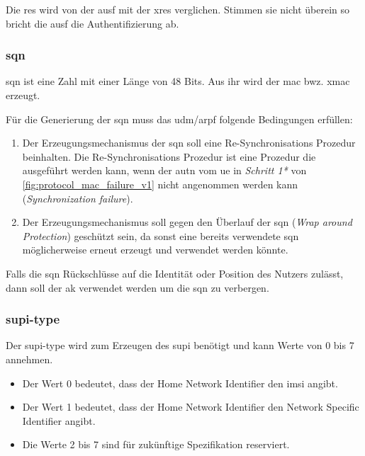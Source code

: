 Die \gls{res} wird von der \gls{ausf} mit der \gls{xres} verglichen.
Stimmen sie nicht überein so bricht die \gls{ausf} die Authentifizierung ab. %

\subsubsection{\gls{sqn}}
\gls{sqn} ist eine Zahl mit einer Länge von 48 Bits. %
Aus ihr wird der \gls{mac} bwz. \gls{xmac} erzeugt. %

Für die Generierung der \gls{sqn} muss das \gls{udm}/\gls{arpf} folgende Bedingungen erfüllen:\\%
\begin{enumerate}
\item Der Erzeugungsmechanismus der \gls{sqn} soll eine Re-Synchronisations Prozedur beinhalten.
Die Re-Synchronisations Prozedur ist eine Prozedur die ausgeführt werden kann, wenn der \gls{autn} vom \gls{ue} in \textit{Schritt 1*} von \cref{fig:protocol_mac_failure_v1} nicht angenommen werden kann (\textit{Synchronization failure}).
\item Der Erzeugungsmechanismus soll gegen den Überlauf der \gls{sqn} (\textit{Wrap around Protection}) geschützt sein, da sonst eine bereits verwendete \gls{sqn} möglicherweise erneut erzeugt und verwendet werden könnte. 
\end{enumerate}

Falls die \gls{sqn} Rückschlüsse auf die Identität oder Position des Nutzers zulässt, dann soll der \gls{ak} verwendet werden um die \gls{sqn} zu verbergen.

\subsubsection{\gls{supi-type}}
Der \gls{supi-type} wird zum Erzeugen des \gls{supi} benötigt und kann Werte von 0 bis 7 annehmen. %
\begin{itemize}
\item Der Wert 0 bedeutet, dass der Home Network Identifier den \gls{imsi} angibt.
\item Der Wert 1 bedeutet, dass der Home Network Identifier den Network Specific Identifier angibt.
\item Die Werte 2 bis 7 sind für zukünftige Spezifikation reserviert.
\end{itemize}

